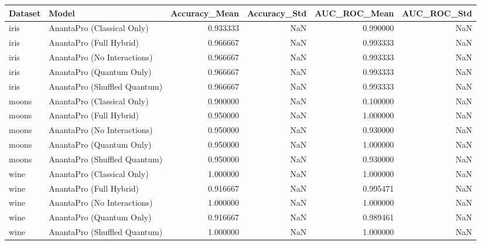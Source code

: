 \begin{tabular}{llrrrr}
\toprule
Dataset & Model & Accuracy_Mean & Accuracy_Std & AUC_ROC_Mean & AUC_ROC_Std \\
\midrule
iris & AnantaPro (Classical Only) & 0.933333 & NaN & 0.990000 & NaN \\
iris & AnantaPro (Full Hybrid) & 0.966667 & NaN & 0.993333 & NaN \\
iris & AnantaPro (No Interactions) & 0.966667 & NaN & 0.993333 & NaN \\
iris & AnantaPro (Quantum Only) & 0.966667 & NaN & 0.993333 & NaN \\
iris & AnantaPro (Shuffled Quantum) & 0.966667 & NaN & 0.993333 & NaN \\
moons & AnantaPro (Classical Only) & 0.900000 & NaN & 0.100000 & NaN \\
moons & AnantaPro (Full Hybrid) & 0.950000 & NaN & 1.000000 & NaN \\
moons & AnantaPro (No Interactions) & 0.950000 & NaN & 0.930000 & NaN \\
moons & AnantaPro (Quantum Only) & 0.950000 & NaN & 1.000000 & NaN \\
moons & AnantaPro (Shuffled Quantum) & 0.950000 & NaN & 0.930000 & NaN \\
wine & AnantaPro (Classical Only) & 1.000000 & NaN & 1.000000 & NaN \\
wine & AnantaPro (Full Hybrid) & 0.916667 & NaN & 0.995471 & NaN \\
wine & AnantaPro (No Interactions) & 1.000000 & NaN & 1.000000 & NaN \\
wine & AnantaPro (Quantum Only) & 0.916667 & NaN & 0.989461 & NaN \\
wine & AnantaPro (Shuffled Quantum) & 1.000000 & NaN & 1.000000 & NaN \\
\bottomrule
\end{tabular}
